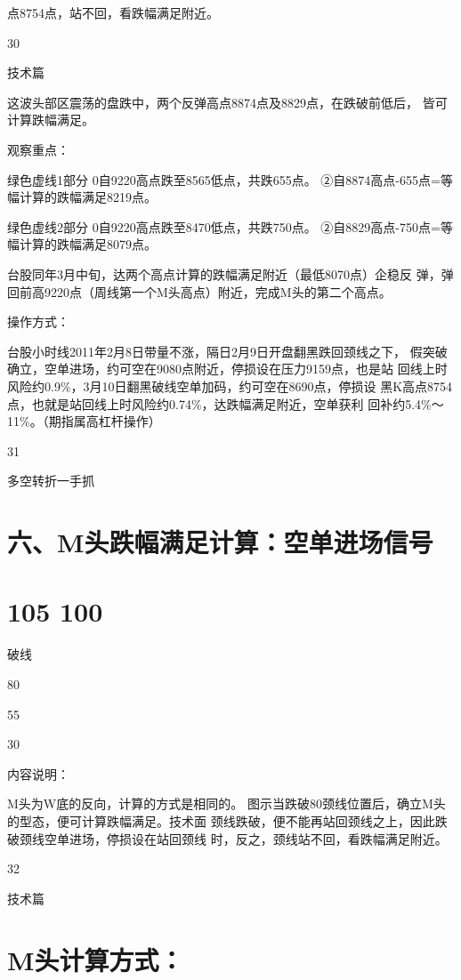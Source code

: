 \documentclass{article}
\begin{document}
点8754点，站不回，看跌幅满足附近。

30

\clearpage

技术篇

这波头部区震荡的盘跌中，两个反弹高点8874点及8829点，在跌破前低后， 皆可计算跌幅满足。

观察重点：

绿色虚线1部分 0自9220高点跌至8565低点，共跌655点。 ②自8874高点-655点=等幅计算的跌幅满足8219点。

绿色虚线2部分 0自9220高点跌至8470低点，共跌750点。 ②自8829高点-750点=等幅计算的跌幅满足8079点。

台股同年3月中旬，达两个高点计算的跌幅满足附近（最低8070点）企稳反 弹，弹回前高9220点（周线第一个M头高点）附近，完成M头的第二个高点。

操作方式：

台股小时线2011年2月8日带量不涨，隔日2月9日开盘翻黑跌回颈线之下， 假突破确立，空单进场，约可空在9080点附近，停损设在压力9159点，也是站 回线上时风险约0.9\%，3月10日翻黑破线空单加码，约可空在8690点，停损设 黑K高点8754点，也就是站回线上时风险约0.74\%，达跌幅满足附近，空单获利 回补约5.4\%～11\%。（期指属高杠杆操作）

31

\clearpage

多空转折一手抓

\section{六、M头跌幅满足计算：空单进场信号}

\section{105 100}

破线

80

55

30

内容说明：

M头为W底的反向，计算的方式是相同的。 图示当跌破80颈线位置后，确立M头的型态，便可计算跌幅满足。技术面 颈线跌破，便不能再站回颈线之上，因此跌破颈线空单进场，停损设在站回颈线 时，反之，颈线站不回，看跌幅满足附近。

32

\clearpage

技术篇

\section{M头计算方式：}
\end{document}
